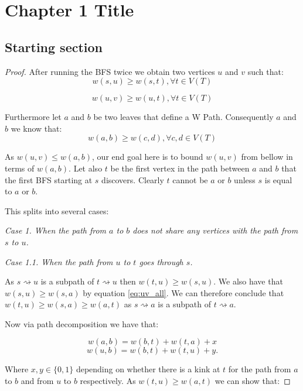 \chapter{Chapter 1 Title}
\label{chapter1}

\section{Starting section}

\newtheorem{w-algorithm}{The W Detection Algorithm is Correct.}

\begin{proof}
After running the BFS twice we obtain two vertices $u$ and $v$ such that:
\begin{equation}
    \label{eq:su_all}
    w(s, u) \ge w(s, t), \forall t \in V(T)
\end{equation}

\begin{equation}
    \label{eq:uv_all}
    w(u, v) \ge w(u, t), \forall t \in V(T)
\end{equation}

Furthermore let $a$ and $b$ be two leaves that define a W Path. Consequently $a$ and $b$ we know that:
$$w(a, b) \ge w(c, d), \forall c, d \in V(T) $$

As $w(u, v) \le w(a, b)$, our end goal here is to bound $w(u, v)$ from bellow in terms of $w(a, b)$. Let also $t$ be the first vertex in the path between $a$ and $b$ that the first BFS starting at $s$ discovers. Clearly $t$ cannot be $a$ or $b$ unless $s$ is equal to $a$ or $b$.

\newpage
This splits into several cases: \linebreak

{\em Case 1. When the path from $a$ to $b$ does not share any vertices with the path from $s$ to $u$.}

{\em Case 1.1. When the path from $u$ to $t$ goes through $s$.}

As $s \rightsquigarrow u$ is a subpath of $t \rightsquigarrow u$ then $w(t, u) \ge w(s, u)$. We also have that $w(s, u) \ge w(s, a)$ by equation \ref{eq:uv_all}. We can therefore conclude that $w(t, u) \ge w(s, a) \ge w(a, t)$ as $s \rightsquigarrow a$ is a subpath of $t \rightsquigarrow a$.


Now via path decomposition we have that:

$$ w(a, b) = w(b, t) + w(t, a) + x  $$
$$ w(u, b) = w(b, t) + w(t, u) + y .$$

Where $x, y \in \{0, 1\}$ depending on whether there is a kink at $t$ for the path from $a$ to $b$ and from $u$ to $b$ respectively. As $w(t, u) \ge w(a, t)$ we can show that:



\end{proof}
